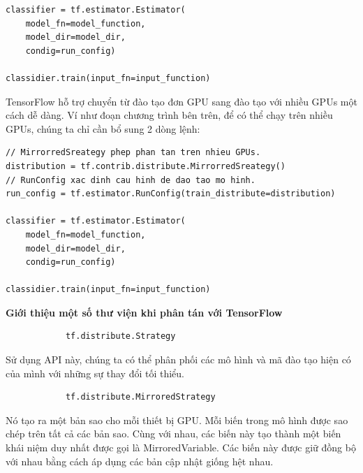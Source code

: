 \documentclass[11pt,a4paper]{article}
\numberwithin{equation}{subsection}
\numberwithin{figure}{subsection}
\numberwithin{table}{subsection}
\begin{document}
\lstset{language=Python}
\lstset{frame=lines}
\lstset{basicstyle=\footnotesize}
\begin{lstlisting}
classifier = tf.estimator.Estimator(
	model_fn=model_function,
	model_dir=model_dir,
	condig=run_config)
	
classidier.train(input_fn=input_function)
\end{lstlisting}

TensorFlow hỗ trợ chuyển từ đào tạo đơn GPU sang đào tạo với nhiều GPUs một cách dễ dàng. Ví như đoạn chương trình bên trên, để có thể chạy trên nhiều GPUs, chúng ta chỉ cần bổ sung 2 dòng lệnh:

\lstset{language=Python}
\lstset{frame=lines}
\lstset{basicstyle=\footnotesize}
\begin{lstlisting}
// MirrorredSreategy phep phan tan tren nhieu GPUs.
distribution = tf.contrib.distribute.MirrorredSreategy() 
// RunConfig xac dinh cau hinh de dao tao mo hinh.
run_config = tf.estimator.RunConfig(train_distribute=distribution) 

classifier = tf.estimator.Estimator(
	model_fn=model_function,
	model_dir=model_dir,
	condig=run_config)
	
classidier.train(input_fn=input_function)
\end{lstlisting}

\textbf{Giới thiệu một số thư viện khi phân tán với TensorFlow}

\lstset{language=Python}
\lstset{frame=lines}
\lstset{basicstyle=\footnotesize}
\begin{lstlisting}
			tf.distribute.Strategy
\end{lstlisting}
Sử dụng API này, chúng ta có thể phân phối các mô hình và mã đào tạo hiện có của mình với những sự thay đổi tối thiểu.
\lstset{language=Python}
\lstset{frame=lines}
\lstset{basicstyle=\footnotesize}
\begin{lstlisting}
			tf.distribute.MirroredStrategy
\end{lstlisting}
Nó tạo ra một bản sao cho mỗi thiết bị GPU. Mỗi biến trong mô hình được sao chép trên tất cả các bản sao. Cùng với nhau, các biến này tạo thành một biến khái niệm duy nhất được gọi là MirroredVariable. Các biến này được giữ đồng bộ với nhau bằng cách áp dụng các bản cập nhật giống hệt nhau.
\end{document}
